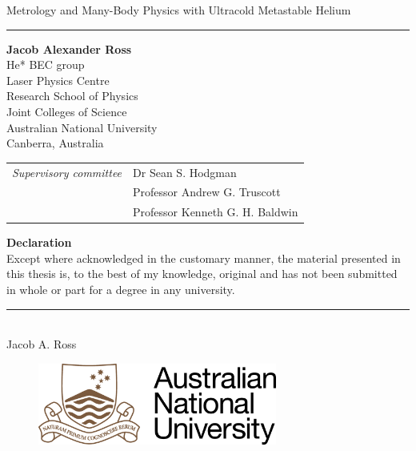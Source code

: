 \begin{flushleft}
\Large{Metrology and Many-Body Physics with Ultracold Metastable Helium\\}
\vspace{0.1cm}
\hrule
\vspace{1cm}
\large{\textbf{Jacob Alexander Ross\\}}
He* BEC group\\
Laser Physics Centre\\
Research School of Physics\\
Joint Colleges of Science\\
Australian National University\\
Canberra, Australia

\vspace{1cm}
\begin{table}[h]
\begin{tabular}{c l}
\emph{\large{Supervisory committee}} & \large{Dr Sean S. Hodgman}\\
                              & \large{Professor Andrew G. Truscott}\\
                              & \large{Professor Kenneth G. H. Baldwin}
\end{tabular}
\end{table}

\vspace{2cm}
\large{\textbf{Declaration\\}}
Except where acknowledged in the customary manner, the material presented in this thesis is, to the best of my knowledge, original and has not been submitted in whole or part for a degree in any university.\\
\end{flushleft}
\begin{flushright}
\vspace{0.5cm}
\rule{3cm}{1pt}\\
Jacob A. Ross
\end{flushright}


\mbox{}
\vfill
\begin{figure}[b]
\begin{center}
\includegraphics[width=0.7\textwidth]{fig/ANU_logo_temp}
\end{center}
\end{figure}

